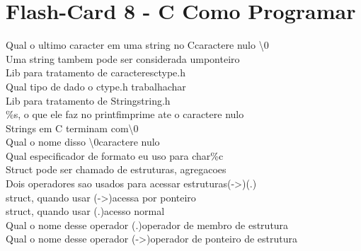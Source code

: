 \documentclass[a4paper,12pt]{article}
\begin{document}
\section*{Flash-Card 8 - C Como Programar} 
Qual o ultimo caracter em uma string no C\dotfill caractere nulo \textbackslash0\\ 
Uma string tambem pode ser considerada um\dotfill ponteiro\\ 
Lib para tratamento de caracteres\dotfill ctype.h\\ 
Qual tipo de dado o ctype.h trabalha\dotfill char\\ 
Lib para tratamento de String\dotfill string.h\\ 
\%s, o que ele faz no printf\dotfill imprime ate o caractere nulo\\ 
Strings em C terminam com\dotfill \textbackslash0\\ 
Qual o nome disso \textbackslash0\dotfill caractere nulo\\ 
Qual especificador de formato eu uso para char\dotfill \%c\\  
Struct pode ser chamado de \dotfill estruturas, agregacoes\\ 
Dois operadores sao usados para acessar estruturas\dotfill (->)(.)\\ 
struct, quando usar (->)\dotfill acessa por ponteiro\\ 
struct, quando usar (.)\dotfill acesso normal\\ 
Qual o nome desse operador (.)\dotfill operador de membro de estrutura\\ 
Qual o nome desse operador (->)\dotfill operador de ponteiro de estrutura\\ 
\end{document}

